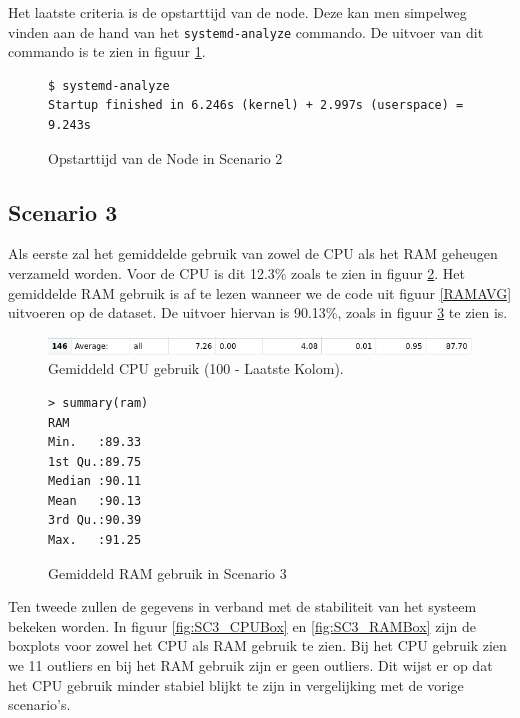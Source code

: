 Het laatste criteria is de opstarttijd van de node. Deze kan men simpelweg vinden aan de hand van het \verb|systemd-analyze| commando. De uitvoer van dit commando is te zien in figuur \ref{SC2_StartTime}.

\begin{figure}[h]
	\centering
	\begin{verbatim} 
$ systemd-analyze
Startup finished in 6.246s (kernel) + 2.997s (userspace) = 9.243s
	\end{verbatim}
	\caption{Opstarttijd van de Node in Scenario 2}
	\label{SC2_StartTime}
\end{figure}

\clearpage
\subsection{Scenario 3}
%

Als eerste zal het gemiddelde gebruik van zowel de CPU als het RAM geheugen verzameld worden. Voor de CPU is dit 12.3\% zoals te zien in figuur \ref{fig:SC3_CPUAVG}. Het gemiddelde RAM gebruik is af te lezen wanneer we de code uit figuur \ref{RAMAVG} uitvoeren op de dataset. De uitvoer hiervan is 90.13\%, zoals in figuur \ref{SC3_RAMAVG} te zien is.
\begin{figure}[h]
	\centering
	\includegraphics[width=\linewidth]{img/SC3_CPUAVG.png}
	\caption{Gemiddeld CPU gebruik (100 - Laatste Kolom).}
	\label{fig:SC3_CPUAVG}
\end{figure}
\begin{figure}[h]
	\centering
	\begin{verbatim} 
> summary(ram)
RAM       
Min.   :89.33  
1st Qu.:89.75  
Median :90.11  
Mean   :90.13  
3rd Qu.:90.39  
Max.   :91.25    
	\end{verbatim}
	\caption{Gemiddeld RAM gebruik in Scenario 3}
	\label{SC3_RAMAVG}
\end{figure}

Ten tweede zullen de gegevens in verband met de stabiliteit van het systeem bekeken worden. In figuur \ref{fig:SC3_CPUBox} en \ref{fig:SC3_RAMBox} zijn de boxplots voor zowel het CPU als RAM gebruik te zien. Bij het CPU gebruik zien we 11 outliers en bij het RAM gebruik zijn er geen outliers. Dit wijst er op dat het CPU gebruik minder stabiel blijkt te zijn in vergelijking met de vorige scenario's.

